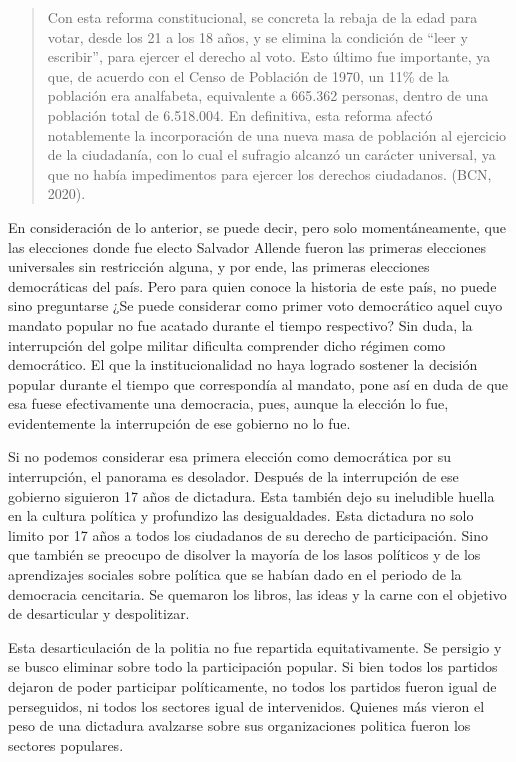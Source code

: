 \documentclass[12pt,twoside]{templates/facsothesis}
\begin{document}
\begin{quote}
Con esta reforma constitucional, se concreta la rebaja de la edad para votar, desde los 21 a los 18 años, y se elimina la condición de ``leer y escribir'', para ejercer el derecho al voto. Esto último fue importante, ya que, de acuerdo con el Censo de Población de 1970, un 11\% de la población era analfabeta, equivalente a 665.362 personas, dentro de una población total de 6.518.004. En definitiva, esta reforma afectó notablemente la incorporación de una nueva masa de población al ejercicio de la ciudadanía, con lo cual el sufragio alcanzó un carácter universal, ya que no había impedimentos para ejercer los derechos ciudadanos. (BCN, 2020).
\end{quote}

En consideración de lo anterior, se puede decir, pero solo momentáneamente, que las elecciones donde fue electo Salvador Allende fueron las primeras elecciones universales sin restricción alguna, y por ende, las primeras elecciones democráticas del país. Pero para quien conoce la historia de este país, no puede sino preguntarse ¿Se puede considerar como primer voto democrático aquel cuyo mandato popular no fue acatado durante el tiempo respectivo? Sin duda, la interrupción del golpe militar dificulta comprender dicho régimen como democrático. El que la institucionalidad no haya logrado sostener la decisión popular durante el tiempo que correspondía al mandato, pone así en duda de que esa fuese efectivamente una democracia, pues, aunque la elección lo fue, evidentemente la interrupción de ese gobierno no lo fue.

Si no podemos considerar esa primera elección como democrática por su interrupción, el panorama es desolador. Después de la interrupción de ese gobierno siguieron 17 años de dictadura. Esta también dejo su ineludible huella en la cultura política y profundizo las desigualdades. Esta dictadura no solo limito por 17 años a todos los ciudadanos de su derecho de participación. Sino que también se preocupo de disolver la mayoría de los lasos políticos y de los aprendizajes sociales sobre política que se habían dado en el periodo de la democracia cencitaria. Se quemaron los libros, las ideas y la carne con el objetivo de desarticular y despolitizar.

Esta desarticulación de la politia no fue repartida equitativamente. Se persigio y se busco eliminar sobre todo la participación popular. Si bien todos los partidos dejaron de poder participar políticamente, no todos los partidos fueron igual de perseguidos, ni todos los sectores igual de intervenidos. Quienes más vieron el peso de una dictadura avalzarse sobre sus organizaciones politica fueron los sectores populares.
\end{document}
